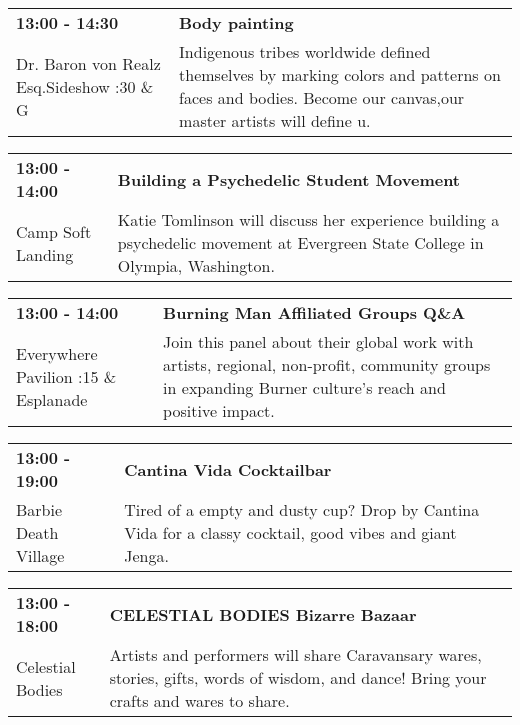 \begin{tabular}{ p{1in} p{2.2in} }
    \textbf{13:00 - 14:30} & \textbf{Body painting} \\
    Dr. Baron von Realz Esq.Sideshow \newline 4:30 \& G & Indigenous tribes worldwide defined themselves by marking colors and patterns on faces and bodies. Become our canvas,our master artists will define u. \\
    \hline 
\end{tabular}
    
\begin{tabular}{ p{1in} p{2.2in} }
    \textbf{13:00 - 14:00} & \textbf{Building a Psychedelic Student Movement } \\
    Camp Soft Landing \newline  & Katie Tomlinson will discuss her experience building a psychedelic movement at Evergreen State College in Olympia, Washington. \\
    \hline 
\end{tabular}
    
\begin{tabular}{ p{1in} p{2.2in} }
    \textbf{13:00 - 14:00} & \textbf{Burning Man Affiliated Groups Q\&A} \\
    Everywhere Pavilion \newline 6:15 \& Esplanade & Join this panel about their global work with artists, regional, non-profit, community groups in expanding Burner culture's reach and positive impact. \\
    \hline 
\end{tabular}
    
\begin{tabular}{ p{1in} p{2.2in} }
    \textbf{13:00 - 19:00} & \textbf{Cantina Vida Cocktailbar} \\
    Barbie Death Village \newline  & Tired of a empty and dusty cup? Drop by Cantina Vida for a classy cocktail, good vibes and giant Jenga. \\
    \hline 
\end{tabular}
    
\begin{tabular}{ p{1in} p{2.2in} }
    \textbf{13:00 - 18:00} & \textbf{CELESTIAL BODIES Bizarre Bazaar} \\
    Celestial Bodies \newline  & Artists and performers will share Caravansary wares, stories, gifts, words of wisdom, and dance! Bring your crafts and wares to share. \\
    \hline 
\end{tabular}
    
